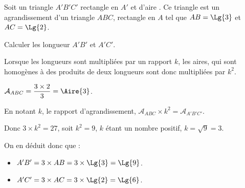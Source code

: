 \begin{exercice*}
    Soit un triangle $A'B'C'$ rectangle en $A'$ et d'aire .
    Ce triangle est un agrandissement d'un triangle $ABC$, rectangle en $A$ tel que $AB=\Lg{3}$ et $AC=\Lg{2}$.

    \medskip
    Calculer les longueur $A'B'$ et $A'C'$.
\end{exercice*}
\begin{corrige}
    Lorsque les longueurs sont multipliées par un rapport $k$, les aires, qui sont homogènes à 
    des produits de deux longueurs sont donc multipliées par $k^2$.

    $\mathcal{A}_{ABC} = \dfrac{3\times 2}{3} = \Aire{3}$.

    En notant $k$, le rapport d'agrandissement, $\mathcal{A}_{ABC} \times k^2 = \mathcal{A}_{A'B'C'}$.

    Donc $3\times k^2 = 27$, soit $k^2 = 9$, $k$ étant un nombre positif, $k = \sqrt{9} = 3$.

    On en déduit donc que :
    \begin{itemize}
        \item $A'B' = 3\times AB = 3 \times \Lg{3} = \Lg{9}$.
        \item $A'C' = 3\times AC = 3 \times \Lg{2} = \Lg{6}$.
    \end{itemize}
\end{corrige}

